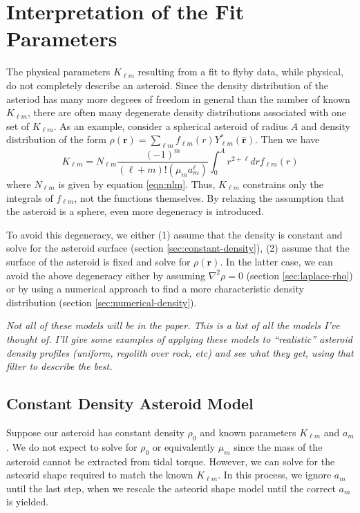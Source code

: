 \documentclass[linenumbers]{aastex631}
\newcommand{\unit}[1]{\hat{\mathbf{#1}}}
\newcommand{\jtd}[1]{{\color{red}\textit{#1}}}
\begin{document}
\section{Interpretation of the Fit Parameters}
The physical parameters $K_{\ell m}$ resulting from a fit to flyby data, while physical, do not completely describe an asteroid. Since the density distribution of the asteriod has many more degrees of freedom in general than the number of known $K_{\ell m}$, there are often many degenerate density distributions associated with one set of $K_{\ell m}$. As an example, consider a spherical asteroid of radius $A$ and density distribution of the form $\rho(\bm r) = \sum_{\ell m} f_{\ell m}(r) Y_{\ell m}^*(\unit r)$. Then we have
\begin{equation}
K_{\ell m} = N_{\ell m} \frac{(-1)^m}{(\ell + m)!(\mu_m a_m^\ell)}\int_0^A r^{2+\ell} dr f_{\ell m}(r)
\end{equation}
where $N_{\ell m}$ is given by equation \ref{eqn:nlm}. Thus, $K_{\ell m}$ constrains only the integrals of $f_{\ell m}$, not the functions themselves. By relaxing the assumption that the asteroid is a sphere, even more degeneracy is introduced.

To avoid this degeneracy, we either (1) assume that the density is constant and solve for the asteroid surface (section \ref{sec:constant-density}), (2) assume that the surface of the asteroid is fixed and solve for $\rho(\bm r)$. In the latter case, we can avoid the above degeneracy either by assuming $\nabla^2 \rho = 0$ (section \ref{sec:laplace-rho}) or by using a numerical approach to find a more characteristic density distribution (section \ref{sec:numerical-density}).

\jtd{Not all of these models will be in the paper. This is a list of all the models I've thought of. I'll give some examples of applying these models to ``realistic'' asteroid density profiles (uniform, regolith over rock, etc) and see what they get, using that filter to describe the best.}

\subsection{Constant Density Asteroid Model}
Suppose our asteroid has constant density $\rho_0$ and known parameters $K_{\ell m}$ and $a_m$. We do not expect to solve for $\rho_0$ or equivalently $\mu_m$ since the mass of the asteroid cannot be extracted from tidal torque. However, we can solve for the asteorid shape required to match the known $K_{\ell m}$. In this process, we ignore $a_m$ until the last step, when we rescale the asteorid shape model until the correct $a_m$ is yielded.
\end{document}
